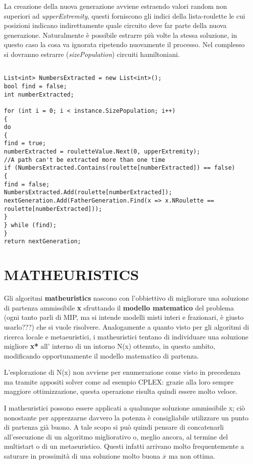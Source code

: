 \documentclass[11pt]{article}
\begin{document}
La creazione della nuova generazione avviene estraendo valori random non superiori ad \textit{upperExtremity}, questi forniscono gli indici della lista-roulette le cui posizioni indicano indirettamente quale circuito deve far parte della nuova generazione. Naturalmente è possibile estrarre più volte la stessa soluzione, in questo caso la cosa va ignorata ripetendo nuovamente il processo. Nel complesso si dovranno estrarre (\textit{sizePopulation}) circuiti hamiltoniani.

\begin{lstlisting}

List<int> NumbersExtracted = new List<int>();
bool find = false;
int numberExtracted;

for (int i = 0; i < instance.SizePopulation; i++)
{
do
{
find = true;
numberExtracted = rouletteValue.Next(0, upperExtremity);
//A path can't be extracted more than one time
if (NumbersExtracted.Contains(roulette[numberExtracted]) == false)
{
find = false;
NumbersExtracted.Add(roulette[numberExtracted]);
nextGeneration.Add(FatherGeneration.Find(x => x.NRoulette == roulette[numberExtracted]));
}
} while (find);
}
return nextGeneration;

\end{lstlisting}

\section*{MATHEURISTICS}
\label{sec:MathEuristiciS}

Gli algoritmi \textbf{matheuristics} nascono con l'obbiettivo di migliorare una soluzione di partenza ammissibile \textbf{x} sfruttando il \textbf{modello matematico} del problema (ogni tanto parli di MIP, ma si intende modelli misti interi e frazionari, è giusto usarlo???) che si vuole risolvere. Analogamente a quanto visto per gli algoritmi di ricerca locale e metaeuristici, i matheuristici tentano di individuare una soluzione migliore \textbf{x*} all' interno di un intorno N(x) ottenuto, in questo ambito, modificando opportunamente il modello matematico di partenza. 

L'esplorazione di N(x) non avviene per enumerazione come visto in precedenza ma tramite appositi solver come ad esempio CPLEX: grazie alla loro sempre maggiore ottimizzazione, questa operazione risulta quindi essere molto veloce. 

I matheuristici possono essere applicati a qualunque soluzione ammissibile x; ciò nonostante per apprezzarne davvero la potenza è consigliabile utilizzare un punto di partenza già buono. A tale scopo si può quindi pensare di concatenarli  all'esecuzione di un algoritmo migliorativo o, meglio ancora, al termine del multistart o di un metaeuristico. Questi infatti arrivano molto frequentemente a saturare in prossimità di una soluzione molto buona \textbf{$\overline{x}$} ma non ottima.
\end{document}
